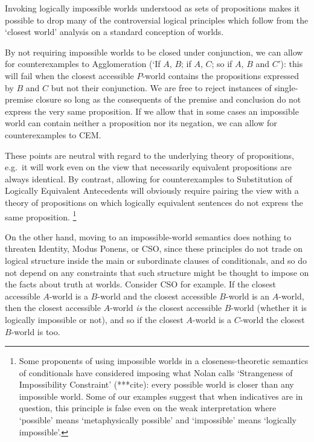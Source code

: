 \documentclass[If.tex]{subfiles}
\begin{document}
Invoking logically impossible worlds understood as sets of propositions makes it possible to drop many of the controversial logical principles which follow from the ‘closest world’ analysis on a standard conception of worlds.  
\begin{prop}
	\ritem
	By not requiring impossible worlds to be closed under conjunction, we can allow for counterexamples to Agglomeration (‘If $A$, $B$; if $A$, $C$; so if $A$, $B$ and $C$’): this will fail when the closest accessible $P$-world contains the propositions expressed by $B$ and $C$ but not their conjunction.
	\ritem
	We are free to reject instances of single-premise closure so long as the consequents of the premise and conclusion do not express the very same proposition.  
	\ritem
	If we allow that in some cases an impossible world can contain neither a proposition nor its negation, we can allow for counterexamples to CEM.  
\end{prop}
These points are neutral with regard to the underlying theory of propositions, e.g.\ it will work even on the view that necessarily equivalent propositions are always identical.  By contrast, allowing for counterexamples to Substitution of Logically Equivalent Antecedents will obviously require pairing the view with a theory of propositions on which logically equivalent sentences do not express the same proposition.%
\footnote{Some proponents of using impossible worlds in a closeness-theoretic semantics of conditionals have considered imposing what Nolan calls ‘Strangeness of Impossibility Constraint’ (***cite): every possible world is closer than any impossible world.  Some of our examples suggest that when indicatives are in question, this principle is false even on the weak interpretation where ‘possible’ means ‘metaphysically possible’ and ‘impossible’ means ‘logically impossible’.}

On the other hand, moving to an impossible-world semantics does nothing to threaten Identity, Modus Ponens, or CSO, since these principles do not trade on logical structure inside the main or subordinate clauses of conditionals, and so do not depend on any constraints that such structure might be thought to impose on the facts about truth at worlds.  Consider CSO for example.  If the closest accessible $A$-world is a $B$-world and the closest accessible $B$-world is an $A$-world, then the closest accessible $A$-world \emph{is} the closest accessible $B$-world (whether it is logically impossible or not), and so if the closest $A$-world is a $C$-world the closest $B$-world is too.  
\end{document}
